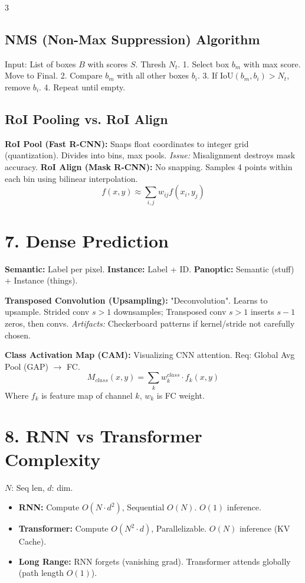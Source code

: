 \documentclass[10pt]{article}
\begin{document}
\begin{multicols*}{3}
\subsection*{NMS (Non-Max Suppression) Algorithm}
Input: List of boxes $B$ with scores $S$. Thresh $N_t$.
1. Select box $b_m$ with max score. Move to Final.
2. Compare $b_m$ with all other boxes $b_i$.
3. If $\text{IoU}(b_m, b_i) > N_t$, remove $b_i$.
4. Repeat until empty.

\subsection*{RoI Pooling vs. RoI Align}
\textbf{RoI Pool (Fast R-CNN):} Snaps float coordinates to integer grid (quantization). Divides into bins, max pools. \textit{Issue:} Misalignment destroys mask accuracy.
\textbf{RoI Align (Mask R-CNN):} No snapping. Samples 4 points within each bin using bilinear interpolation.
$$ f(x,y) \approx \sum_{i,j} w_{ij} f(x_i, y_j) $$

\section*{7. Dense Prediction}
\textbf{Semantic:} Label per pixel. \textbf{Instance:} Label + ID. \textbf{Panoptic:} Semantic (stuff) + Instance (things).

\textbf{Transposed Convolution (Upsampling):}
"Deconvolution". Learns to upsample.
Strided conv $s>1$ downsamples; Transposed conv $s>1$ inserts $s-1$ zeros, then convs.
\textit{Artifacts:} Checkerboard patterns if kernel/stride not carefully chosen.

\textbf{Class Activation Map (CAM):}
Visualizing CNN attention. Req: Global Avg Pool (GAP) $\to$ FC.
$$ M_{class}(x,y) = \sum_k w_k^{class} \cdot f_k(x,y) $$
Where $f_k$ is feature map of channel $k$, $w_k$ is FC weight.

\section*{8. RNN vs Transformer Complexity}
$N$: Seq len, $d$: dim.
\begin{itemize}
    \item \textbf{RNN:} Compute $O(N \cdot d^2)$, Sequential $O(N)$. $O(1)$ inference.
    \item \textbf{Transformer:} Compute $O(N^2 \cdot d)$, Parallelizable. $O(N)$ inference (KV Cache).
    \item \textbf{Long Range:} RNN forgets (vanishing grad). Transformer attends globally (path length $O(1)$).
\end{itemize}


\end{multicols*}
\end{document}
